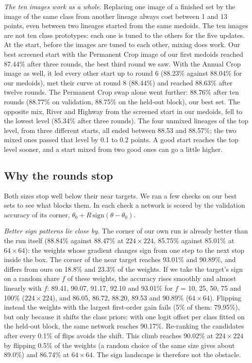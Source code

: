 \documentclass[journal]{IEEEtran}
\begin{document}
\emph{The ten images work as a whole.} Replacing one image of a finished set by the image of the same class from
another lineage always cost between 1 and 13 points, even between two lineages started from the same medoids. The ten
images are not ten class prototypes: each one is tuned to the others for the five updates. At the start, before the
images are tuned to each other, mixing does work. Our best screened start with the Permanent Crop image of our first
medoids reached 87.44\% after three rounds, the best third round we saw. With the Annual Crop image as well, it led
every other start up to round 6 (88.23\% against 88.04\% for our medoids), met their curve at round 8 (88.44\%) and
reached 88.63\% after twelve rounds. The Permanent Crop swap alone went further: 88.76\% after ten rounds (88.77\% on
validation, 88.75\% on the held-out block), our best set. The opposite mix, River and Highway from the screened start
in our medoids, fell to the lowest level (85.34\% after three rounds). The four unmixed lineages of the top level, from
three different starts, all ended between 88.53 and 88.57\%; the two mixed ones passed that level by 0.1 to 0.2 points.
A good start reaches the top level sooner, and a start mixed from two good ones can go a little higher.

\subsection{Why the rounds stop}
\label{sec:plateau}
Both sizes stop well below their near targets. We ran a few checks on our best sets to see what blocks them. In
each check a network is scored by the validation accuracy of its corner, $\theta_0+R\,\mathrm{sign}(\theta-\theta_0)$.

\emph{Better sign patterns lie close by.} The corner of our own run is already better than the run itself (88.84\%
against 88.47\% at $224\times224$, 85.75\% against 85.01\% at $64\times64$): the weights whose gradient changes sign
from one step to the next stop inside the box. The corner of the near target reaches 93.01\% and 90.89\%, and differs
from ours on 18.8\% and 23.3\% of the weights. If we take the target's sign on a random share $f$ of these weights,
the accuracy rises smoothly and almost linearly with $f$: 89.41, 90.07, 91.17, 92.10 and 93.01\% for $f$ = 10, 25,
50, 75 and 100\% ($224\times224$), and 86.05, 86.72, 88.20, 89.53 and 90.89\% ($64\times64$). Flipping instead the
weights with the largest first-order gain fails (5\% of them: 79.95\%), but only because it shifts the class priors:
with one logit offset per class fitted on the held-out block, the same network reaches 90.17\%. Re-ranking the
candidates after every 0.1\% of flips avoids the shift. This climb reaches 90.02\% at $224\times224$ by flipping 0.5\%
of the weights (a random choice of the same size gives about 89.0\%) and 86.74\% at $64\times64$. The sign landscape
is therefore not the obstacle.
\end{document}
